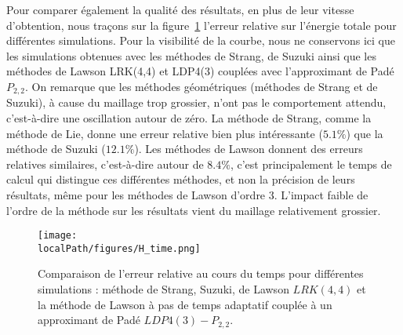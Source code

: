 Pour comparer également la qualité des résultats, en plus de leur vitesse d'obtention, nous traçons sur la figure~\ref{fig:3:H_time} l'erreur relative sur l'énergie totale pour différentes simulations. Pour la visibilité de la courbe, nous ne conservons ici que les simulations obtenues avec les méthodes de Strang, de Suzuki ainsi que les méthodes de Lawson LRK(4,4) et LDP4(3) couplées avec l'approximant de Padé $P_{2,2}$. On remarque que les méthodes géométriques (méthodes de Strang et de Suzuki), à cause du maillage trop grossier, n'ont pas le comportement attendu, c'est-à-dire une oscillation autour de zéro. La méthode de Strang, comme la méthode de Lie, donne une erreur relative bien plus intéressante ($5.1\%$) que la méthode de Suzuki ($12.1\%$). Les méthodes de Lawson donnent des erreurs relatives similaires, c'est-à-dire autour de $8.4\%$, c'est principalement le temps de calcul qui distingue ces différentes méthodes, et non la précision de leurs résultats, même pour les méthodes de Lawson d'ordre 3. L'impact faible de l'ordre de la méthode sur les résultats vient du maillage relativement grossier.

\begin{figure}
  \centering
  \texttt{[image: \\localPath/figures/H\_time.png]}
  \caption{Comparaison de l'erreur relative au cours du temps pour différentes simulations : méthode de Strang, Suzuki, de Lawson $LRK(4,4)$ et la méthode de Lawson à pas de temps adaptatif couplée à un approximant de Padé $LDP4(3)-P_{2,2}$.}
  \label{fig:3:H_time}
\end{figure}



